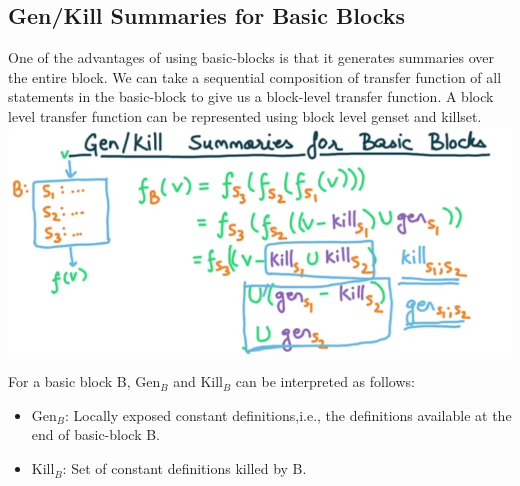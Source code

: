 \subsection{Gen/Kill Summaries for Basic Blocks}
One of the advantages of using basic-blocks is that it generates summaries over the entire block. We can take a sequential composition of transfer function of all statements in the basic-block to give us a block-level transfer function.
A block level transfer function can be represented using block level genset and killset.
\includegraphics[scale=0.5]{images/89_3.png}

For a basic block B, Gen$_B$ and Kill$_B$ can be interpreted as follows:
\begin{itemize}
    \item Gen$_B$: Locally exposed constant definitions,i.e., the definitions available at the end of basic-block B.
    \item Kill$_B$: Set of constant definitions killed by B.
\end{itemize}